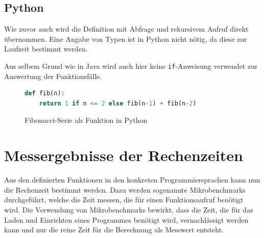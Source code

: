 \documentclass[11pt, parskip=half]{scrartcl}       %
\begin{document}
\subsection{Python}

Wie zuvor auch wird die Definition mit Abfrage und rekursivem Aufruf direkt übernommen.
Eine Angabe von Typen ist in Python nicht nötig, da diese zur Laufzeit bestimmt werden.

Aus selbem Grund wie in Java wird auch hier keine \texttt{if}-Anweisung verwendet zur Auswertung der Funktionsfälle.

\begin{figure}[h]
  \centering
\begin{lstlisting}[language=python]
  def fib(n):
	return 1 if n <= 2 else fib(n-1) + fib(n-2)
\end{lstlisting}  
  \caption{Fibonacci-Serie als Funktion in Python}
  \label{fig:code-python}
\end{figure}


\section{Messergebnisse der Rechenzeiten}

Aus den definierten Funktionen in den konkreten Programmiersprachen kann nun die Rechenzeit bestimmt werden.
Dazu werden sogenannte Mikrobenchmarks durchgeführt, welche die Zeit messen, die für einen Funktionsaufruf benötigt wird.
Die Verwendung von Mikrobenchmarks bewirkt, dass die Zeit, die für das Laden und Einrichten eines Programmes benötigt wird, vernachlässigt werden kann und nur die reine Zeit für die Berechnung als Messwert entsteht.
\end{document}
